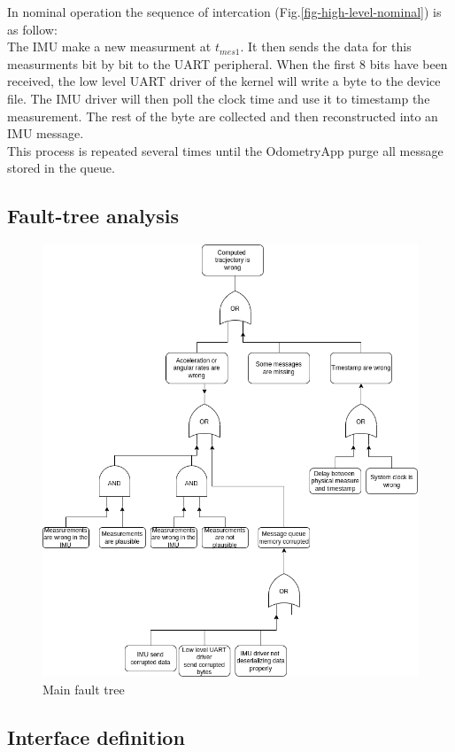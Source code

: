 In nominal operation the sequence of intercation (Fig.\ref{fig-high-level-nominal}) is as follow:\\
The IMU make a new measurment at $t_{mes1}$.
It then sends the data for this measurments bit by bit to the UART peripheral.
When the first 8 bits have been received, the low level UART driver of the kernel will write a byte to the device file.
The IMU driver will then poll the clock time and use it to timestamp the measurement.
The rest of the byte are collected and then reconstructed into an IMU message.\\

This process is repeated several times until the OdometryApp purge all message stored in the queue.\\

\subsection{Fault-tree analysis}

\begin{figure}[H]
    \centering
    \includegraphics[width=1.0 \textwidth]{diagrams/main_fault_tree.drawio.png}
    \caption{Main fault tree}
    \label{fig-main-fault-tree}
\end{figure}


\subsection{Interface definition}
